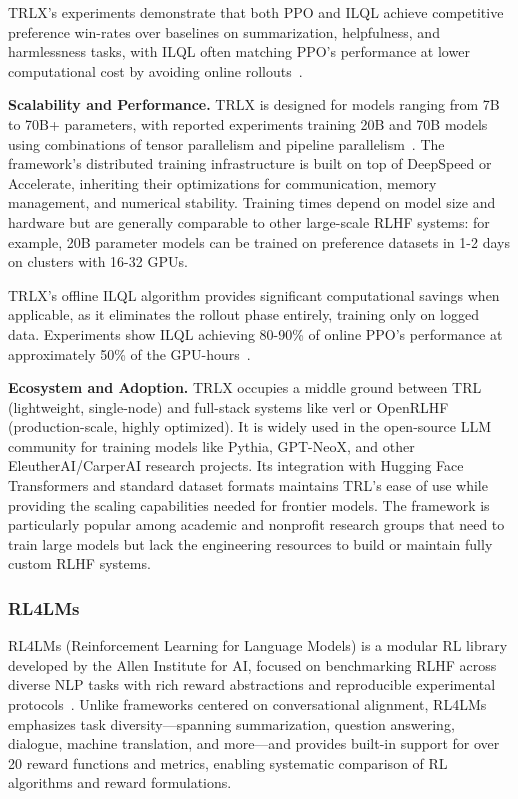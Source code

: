 \documentclass[conference]{IEEEtran}
\begin{document}
TRLX's experiments demonstrate that both PPO and ILQL achieve competitive preference win-rates over baselines on summarization, helpfulness, and harmlessness tasks, with ILQL often matching PPO's performance at lower computational cost by avoiding online rollouts~\cite{trlx-paper}.

\textbf{Scalability and Performance.} TRLX is designed for models ranging from 7B to 70B+ parameters, with reported experiments training 20B and 70B models using combinations of tensor parallelism and pipeline parallelism~\cite{trlx-blog}. The framework's distributed training infrastructure is built on top of DeepSpeed or Accelerate, inheriting their optimizations for communication, memory management, and numerical stability. Training times depend on model size and hardware but are generally comparable to other large-scale RLHF systems: for example, 20B parameter models can be trained on preference datasets in 1-2 days on clusters with 16-32 GPUs.

TRLX's offline ILQL algorithm provides significant computational savings when applicable, as it eliminates the rollout phase entirely, training only on logged data. Experiments show ILQL achieving 80-90\% of online PPO's performance at approximately 50\% of the GPU-hours~\cite{trlx-paper}.

\textbf{Ecosystem and Adoption.} TRLX occupies a middle ground between TRL (lightweight, single-node) and full-stack systems like verl or OpenRLHF (production-scale, highly optimized). It is widely used in the open-source LLM community for training models like Pythia, GPT-NeoX, and other EleutherAI/CarperAI research projects. Its integration with Hugging Face Transformers and standard dataset formats maintains TRL's ease of use while providing the scaling capabilities needed for frontier models. The framework is particularly popular among academic and nonprofit research groups that need to train large models but lack the engineering resources to build or maintain fully custom RLHF systems.


\subsubsection{RL4LMs}

RL4LMs (Reinforcement Learning for Language Models) is a modular RL library developed by the Allen Institute for AI, focused on benchmarking RLHF across diverse NLP tasks with rich reward abstractions and reproducible experimental protocols~\cite{rl4lms-github, rl4lms-paper}. Unlike frameworks centered on conversational alignment, RL4LMs emphasizes task diversity—spanning summarization, question answering, dialogue, machine translation, and more—and provides built-in support for over 20 reward functions and metrics, enabling systematic comparison of RL algorithms and reward formulations.
\end{document}
